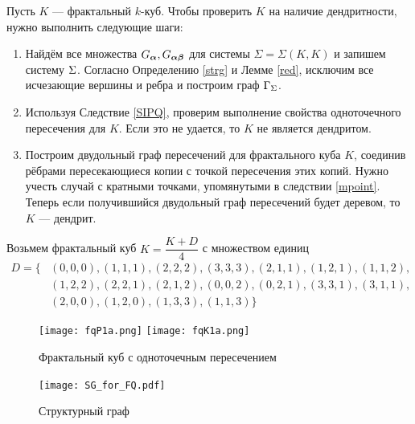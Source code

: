 Пусть $K$ --- фрактальный $k$-куб.
Чтобы проверить $K$ на наличие дендритности, нужно выполнить следующие шаги:

 \begin{enumerate}

    \item Найдём все множества $G_{\bm{\alpha}}, G_{{\bm{\alpha}}{\bm{\beta}}}$ для системы $\Sigma=\Sigma(K,K)$ и запишем систему $\Sigma$.
    Согласно Определению \ref{strg} и Лемме \ref{red}, исключим все исчезающие вершины и ребра и построим граф $\Gamma_\Sigma$.
   
    \item Используя Следствие \ref{SIPQ}, проверим выполнение свойства одноточечного пересечения для $K$.
    Если это не удается, то $K$ не является дендритом.
    
    \item Построим двудольный граф пересечений для фрактального куба $K$, соединив рёбрами пересекающиеся копии с точкой пересечения этих копий. 
    Нужно учесть случай с кратными точками, упомянутыми в следствии \ref{mpoint}.
    Теперь если получившийся двудольный граф пересечений будет деревом, то $K$ --- дендрит.    
\end{enumerate}


\begin{example}
Возьмем фрактальный куб $K=\dfrac{K+D}{4}$ с множеством единиц 
\begin{equation*}
\begin{split}
D=\{
    &(0,0,0), (1,1,1), (2,2,2), (3,3,3), (2,1,1), (1,2,1), (1,1,2),\\ 
    & (1,2,2),(2,2,1), (2,1,2), (0,0,2), (0,2,1), (3,3,1), (3,1,1),\\ 
    & (2,0,0), (1,2,0),(1,3,3), (1,1,3)\}     
\end{split}
\end{equation*}
 
\begin{figure}[H]
    \centering
    \texttt{[image: fqP1a.png]}
    \hfill
    \texttt{[image: fqK1a.png]}
    \caption{Фрактальный куб с одноточечным пересечением}
    \label{fig:fq}
\end{figure}

\begin{figure}[H]
    \centering
    \texttt{[image: SG\_for\_FQ.pdf]}
    \caption{Структурный граф}
    \label{fig:fq_sg}
\end{figure}
\end{example}